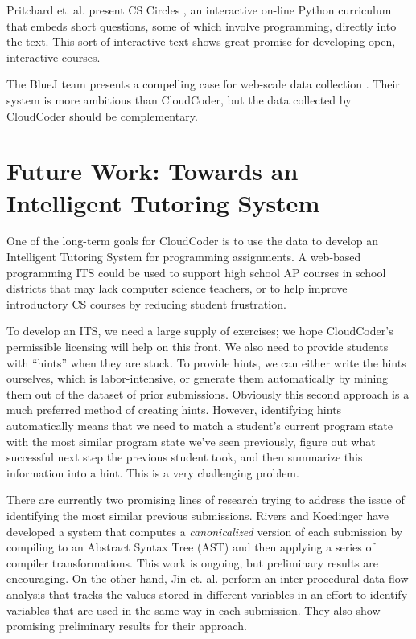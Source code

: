 \documentclass{sig-alternate}
\begin{document}
Pritchard et. al. present CS Circles
\cite{Pritchard:2013:CCI:2445196.2445370}, an interactive on-line
Python curriculum that embeds short questions, some of which involve
programming, directly into the text.  This sort of interactive text
shows great promise for developing open, interactive courses.

The BlueJ team presents a compelling case for web-scale data
collection \cite{Utting:2012:WDG:2361276.2361278}.  Their system is
more ambitious than CloudCoder, but the data collected by CloudCoder
should be complementary.


\section{Future Work: Towards an Intelligent Tutoring System}

One of the long-term goals for CloudCoder is to use the data to
develop an Intelligent Tutoring System for programming assignments.
A web-based programming ITS could be used to support high school
AP courses in school districts that may lack computer science
teachers, or to help improve introductory CS courses by reducing
student frustration.

To develop an ITS, we need a large supply of exercises; we hope
CloudCoder's permissible licensing will help on this front.  We also
need to provide students with ``hints'' when they are stuck.  To
provide hints, we can either write the hints ourselves, which is
labor-intensive, or generate them automatically by mining them out of
the dataset of prior submissions.  Obviously this second approach is
a much preferred method of creating hints.  However, identifying hints
automatically means that we need to match a student's current program
state with the most similar program state we've seen previously, 
figure out what successful next step the previous student took, and
then summarize this information into a hint.  This is a very
challenging problem.

There are currently two promising lines of research
trying to address the issue of identifying the most similar previous submissions.  Rivers and Koedinger \cite{rivers-its2012} have developed a
system that computes a {\em canonicalized} version of each submission
by compiling to an Abstract Syntax Tree (AST) and then applying a
series of compiler transformations.  This work is ongoing, but
preliminary results are encouraging.
On the other hand, Jin et. al. \cite{Jin:2012:PRA:2345840.2345889, jin-kdd2011} perform
an inter-procedural data flow analysis that tracks the values stored
in different variables in an effort to identify variables that are
used in the same way in each submission.  They also show promising preliminary
results for their approach.
\end{document}

